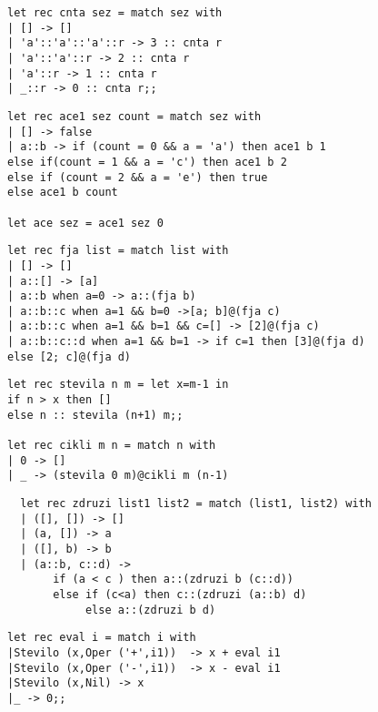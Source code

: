 \begin{Odgovor}{2.17}
\begin{lstlisting}
let rec cnta sez = match sez with
| [] -> []
| 'a'::'a'::'a'::r -> 3 :: cnta r
| 'a'::'a'::r -> 2 :: cnta r
| 'a'::r -> 1 :: cnta r
| _::r -> 0 :: cnta r;;
\end{lstlisting}
\end{Odgovor}
\begin{Odgovor}{2.19}
\begin{lstlisting}
let rec ace1 sez count = match sez with
| [] -> false
| a::b -> if (count = 0 && a = 'a') then ace1 b 1
else if(count = 1 && a = 'c') then ace1 b 2
else if (count = 2 && a = 'e') then true
else ace1 b count

let ace sez = ace1 sez 0
\end{lstlisting}
\end{Odgovor}
\begin{Odgovor}{2.20}
\begin{lstlisting}
let rec fja list = match list with
| [] -> []
| a::[] -> [a]
| a::b when a=0 -> a::(fja b)
| a::b::c when a=1 && b=0 ->[a; b]@(fja c)
| a::b::c when a=1 && b=1 && c=[] -> [2]@(fja c)
| a::b::c::d when a=1 && b=1 -> if c=1 then [3]@(fja d)
else [2; c]@(fja d)
\end{lstlisting}
\end{Odgovor}
\begin{Odgovor}{2.21}
\begin{lstlisting}
let rec stevila n m = let x=m-1 in
if n > x then []
else n :: stevila (n+1) m;;

let rec cikli m n = match n with
| 0 -> []
| _ -> (stevila 0 m)@cikli m (n-1)
\end{lstlisting}
\end{Odgovor}
\begin{Odgovor}{2.26}
\begin{lstlisting}
  let rec zdruzi list1 list2 = match (list1, list2) with
  | ([], []) -> []
  | (a, []) -> a
  | ([], b) -> b
  | (a::b, c::d) ->
       if (a < c ) then a::(zdruzi b (c::d))
       else if (c<a) then c::(zdruzi (a::b) d)
            else a::(zdruzi b d)
\end{lstlisting}
  
\end{Odgovor}
\begin{Odgovor}{2.41}
\begin{lstlisting}
let rec eval i = match i with
|Stevilo (x,Oper ('+',i1))  -> x + eval i1
|Stevilo (x,Oper ('-',i1))  -> x - eval i1
|Stevilo (x,Nil) -> x
|_ -> 0;;
\end{lstlisting}
\end{Odgovor}
